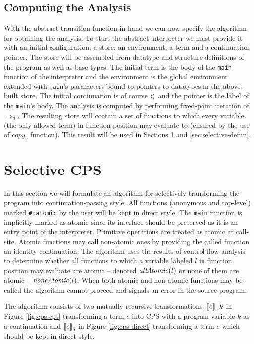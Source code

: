 \subsection*{Computing the Analysis}
With the abstract transition function in hand we can now specify the algorithm for obtaining the analysis.
To start the abstract interpreter we must provide it with an initial configuration: a store, an environment, a term and a continuation pointer.
The store will be assembled from datatype and structure definitions of the program as well as base types.
The initial term is the body of the \lstinline!main! function of the interpreter and the environment is the global environment extended with \lstinline!main!'s parameters bound to pointers to datatypes in the above-built store.
The initial continuation is of course $\left<  \right>$ and the pointer is the label of the \lstinline!main!'s body.
The analysis is computed by performing fixed-point iteration of $\Rightarrow_a$.
The resulting store will contain a set of functions to which every variable (the only allowed term) in function position may evaluate to (ensured by the use of $\mathit{copy}_v$ function).
This result will be used in Sections \ref{sec:selective-cps} and \ref{sec:selective-defun}.

\section{Selective CPS}\label{sec:selective-cps}
In this section we will formulate an algorithm for selectively transforming the program into continuation-passing style.
All functions (anonymous and top-level) marked \lstinline!#:atomic! by the user will be kept in direct style.
The \lstinline!main! function is implicitly marked as atomic since its interface should be preserved as it is an entry point of the interpreter.
Primitive operations are treated as atomic at call-site.
Atomic functions may call non-atomic ones by providing the called function an identity continuation.
The algorithm uses the results of control-flow analysis to determine whether all functions to which a variable labeled $l$ in function position may evaluate are atomic -- denoted $\mathit{allAtomic}(l)$ or none of them are atomic -- $\mathit{noneAtomic}(l)$.
When both atomic and non-atomic functions may be called the algorithm cannot proceed and signals an error in the source program.

The algorithm consists of two mutually recursive transformations: $\left\llbracket e \right\rrbracket_c k$ in Figure \ref{fig:cps-cps} transforming a term $e$ into CPS with a program variable $k$ as a continuation and $\left\llbracket e \right\rrbracket_d$ in Figure \ref{fig:cps-direct} transforming a term $e$ which should be kept in direct style.

